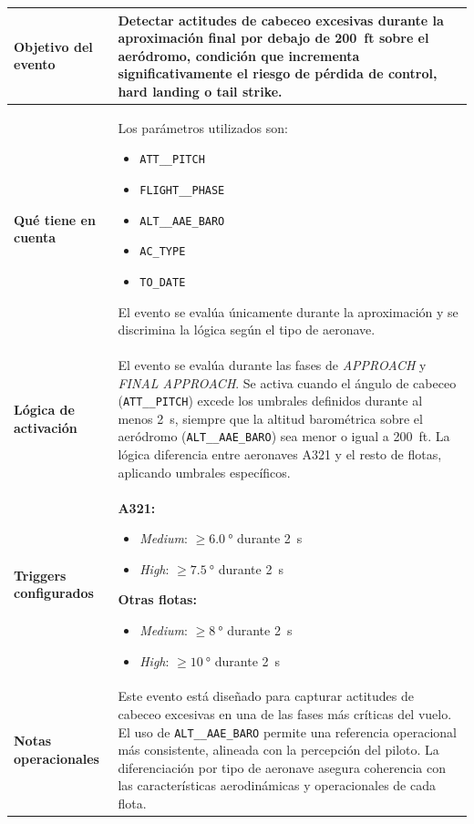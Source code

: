 \documentclass[11pt,a4paper]{article}
\begin{document}
	\begin{longtable}{p{5cm} p{9.5cm}}
		\hline
		\textbf{Objetivo del evento} &
		Detectar actitudes de cabeceo excesivas durante la aproximación final por debajo de \SI{200}{ft} sobre el aeródromo, condición que incrementa significativamente el riesgo de pérdida de control, hard landing o tail strike. \\
		\hline
		
		\textbf{Qué tiene en cuenta} &
		Los parámetros utilizados son:
		\begin{itemize}
			\item \texttt{ATT\_\_PITCH}
			\item \texttt{FLIGHT\_\_PHASE}
			\item \texttt{ALT\_\_AAE\_BARO}
			\item \texttt{AC\_TYPE}
			\item \texttt{TO\_DATE}
		\end{itemize}
		El evento se evalúa únicamente durante la aproximación y se discrimina la lógica según el tipo de aeronave. \\
		\hline
		
		\textbf{Lógica de activación} &
		El evento se evalúa durante las fases de \textit{APPROACH} y \textit{FINAL APPROACH}.  
		Se activa cuando el ángulo de cabeceo (\texttt{ATT\_\_PITCH}) excede los umbrales definidos durante al menos \SI{2}{s}, siempre que la altitud barométrica sobre el aeródromo (\texttt{ALT\_\_AAE\_BARO}) sea menor o igual a \SI{200}{ft}.  
		La lógica diferencia entre aeronaves A321 y el resto de flotas, aplicando umbrales específicos. \\
		\hline
		
		\textbf{Triggers configurados} &
		\textbf{A321:}
		\begin{itemize}
			\item \textit{Medium}: \(\geq \SI{6.0}{\degree}\) durante \SI{2}{s}
			\item \textit{High}: \(\geq \SI{7.5}{\degree}\) durante \SI{2}{s}
		\end{itemize}
		
		\textbf{Otras flotas:}
		\begin{itemize}
			\item \textit{Medium}: \(\geq \SI{8}{\degree}\) durante \SI{2}{s}
			\item \textit{High}: \(\geq \SI{10}{\degree}\) durante \SI{2}{s}
		\end{itemize}
		\\
		\hline
		
		\textbf{Notas operacionales} &
		Este evento está diseñado para capturar actitudes de cabeceo excesivas en una de las fases más críticas del vuelo.  
		El uso de \texttt{ALT\_\_AAE\_BARO} permite una referencia operacional más consistente, alineada con la percepción del piloto.  
		La diferenciación por tipo de aeronave asegura coherencia con las características aerodinámicas y operacionales de cada flota. \\
		\hline
	\end{longtable}
	
\end{document}
